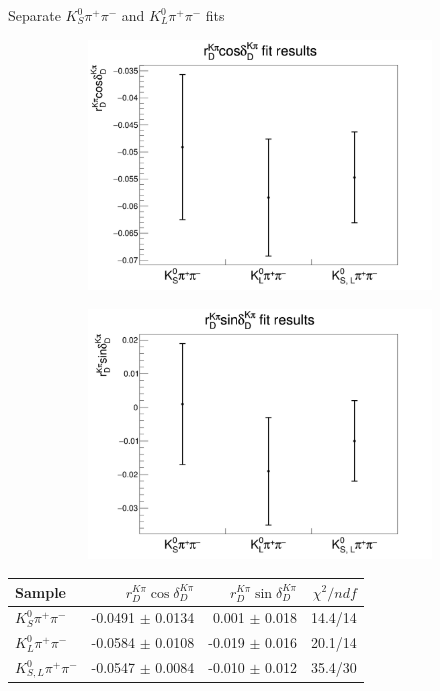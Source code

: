 \documentclass{beamer}
\begin{document}
\begin{frame}{Separate $K_S^0\pi^+\pi^-$ and $K_L^0\pi^+\pi^-$ fits}
  \begin{figure}
    \centering
    \begin{subfigure}{0.5\textwidth}
      \centering
      \includegraphics[width=\textwidth]{rDcosDeltaK0pipi.png}
    \end{subfigure}%
    \begin{subfigure}{0.5\textwidth}
      \centering
      \includegraphics[width=\textwidth]{rDsinDeltaK0pipi.png}
    \end{subfigure}
  \end{figure}
  \centering
  \begin{tabular}{lrrr}
    \hline
    Sample                 & $r_D^{K\pi}\cos\delta_D^{K\pi}$ & $r_D^{K\pi}\sin\delta_D^{K\pi}$ & $\chi^2/{ndf}$ \\
    \hline
    $K^0_S \pi^+\pi^-$     & -0.0491 $\pm$ 0.0134 &  0.001 $\pm$ 0.018 & 14.4/14 \\
    $K^0_L \pi^+\pi^-$     & -0.0584 $\pm$ 0.0108 & -0.019 $\pm$ 0.016 & 20.1/14 \\
    $K^0_{S,L} \pi^+\pi^-$ & -0.0547 $\pm$ 0.0084 & -0.010 $\pm$ 0.012 & 35.4/30 \\
    \hline
  \end{tabular}
\end{frame}
\end{document}
